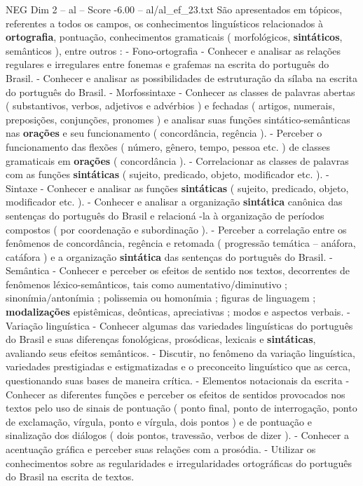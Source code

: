 \begin{textsample}{NEG Dim 2 – al – Score -6.00 – al/al\_ef\_23.txt}
São apresentados em tópicos, referentes a todos os campos, os conhecimentos linguísticos relacionados à \textbf{ortografia}, pontuação, conhecimentos gramaticais ( morfológicos, \textbf{sintáticos}, semânticos ), entre outros : - Fono-ortografia - Conhecer e analisar as relações regulares e irregulares entre fonemas e grafemas na escrita do português do Brasil. - Conhecer e analisar as possibilidades de estruturação da sílaba na escrita do português do Brasil. - Morfossintaxe - Conhecer as classes de palavras abertas ( substantivos, verbos, adjetivos e advérbios ) e fechadas ( artigos, numerais, preposições, conjunções, pronomes ) e analisar suas funções sintático-semânticas nas \textbf{orações} e seu funcionamento ( concordância, regência ). - Perceber o funcionamento das flexões ( número, gênero, tempo, pessoa etc. ) de classes gramaticais em \textbf{orações} ( concordância ). - Correlacionar as classes de palavras com as funções \textbf{sintáticas} ( sujeito, predicado, objeto, modificador etc. ). - Sintaxe - Conhecer e analisar as funções \textbf{sintáticas} ( sujeito, predicado, objeto, modificador etc. ). - Conhecer e analisar a organização \textbf{sintática} canônica das sentenças do português do Brasil e relacioná -la à organização de períodos compostos ( por coordenação e subordinação ). - Perceber a correlação entre os fenômenos de concordância, regência e retomada ( progressão temática – anáfora, catáfora ) e a organização \textbf{sintática} das sentenças do português do Brasil. - Semântica - Conhecer e perceber os efeitos de sentido nos textos, decorrentes de fenômenos léxico-semânticos, tais como aumentativo/diminutivo ; sinonímia/antonímia ; polissemia ou homonímia ; figuras de linguagem ; \textbf{modalizações} epistêmicas, deônticas, apreciativas ; modos e aspectos verbais. - Variação linguística - Conhecer algumas das variedades linguísticas do português do Brasil e suas diferenças fonológicas, prosódicas, lexicais e \textbf{sintáticas}, avaliando seus efeitos semânticos. - Discutir, no fenômeno da variação linguística, variedades prestigiadas e estigmatizadas e o preconceito linguístico que as cerca, questionando suas bases de maneira crítica. - Elementos notacionais da escrita - Conhecer as diferentes funções e perceber os efeitos de sentidos provocados nos textos pelo uso de sinais de pontuação ( ponto final, ponto de interrogação, ponto de exclamação, vírgula, ponto e vírgula, dois pontos ) e de pontuação e sinalização dos diálogos ( dois pontos, travessão, verbos de dizer ). - Conhecer a acentuação gráfica e perceber suas relações com a prosódia. - Utilizar os conhecimentos sobre as regularidades e irregularidades ortográficas do português do Brasil na escrita de textos.

\end{textsample}
